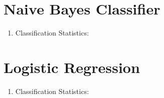 \documentclass[12pt]{article}
\begin{document}
	\section{Naive Bayes Classifier}
	
	\begin{enumerate}
		
		\item Classification Statistics:\\

		
	\end{enumerate}
	
	
	
	\section{Logistic Regression}
	
	\begin{enumerate}
		
		\item Classification Statistics:\\
		
		
	\end{enumerate}
	
\end{document}
